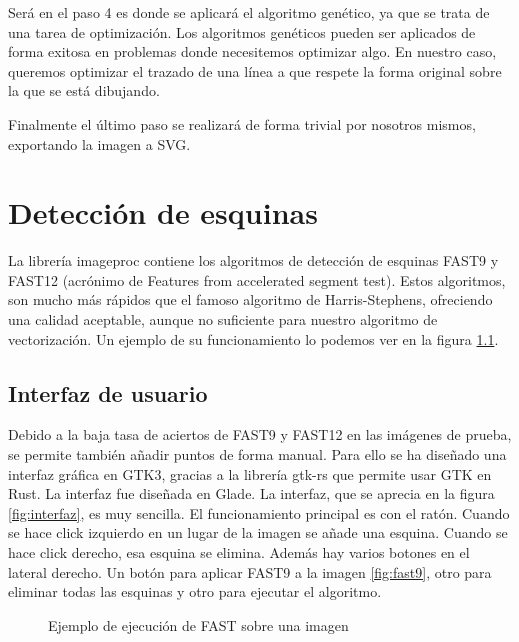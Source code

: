 \documentclass{report}
\begin{document}
Será en el paso 4 es donde se aplicará el algoritmo genético, ya que se trata de una tarea de 
optimización. Los algoritmos genéticos pueden ser aplicados de forma exitosa en problemas donde 
necesitemos optimizar algo. En nuestro caso, queremos optimizar el trazado de una línea a que 
respete la forma original sobre la que se está dibujando.

Finalmente el último paso se realizará de forma trivial por nosotros mismos, 
exportando la imagen a SVG.

\chapter{Detección de esquinas}
La librería imageproc contiene los algoritmos de detección de esquinas
FAST9 y FAST12 \cite{rosten_2006_machine} (acrónimo de Features from accelerated segment test). 
Estos algoritmos, son mucho más rápidos que el
 famoso algoritmo de Harris-Stephens, ofreciendo una calidad aceptable, aunque no suficiente para 
 nuestro algoritmo de vectorización. Un ejemplo de su funcionamiento lo podemos ver en la 
 figura \ref{fig:fast-png}.


\section{Interfaz de usuario}

Debido a la baja tasa de aciertos de FAST9 y FAST12 en las imágenes de prueba, se permite también
añadir puntos de forma manual. Para ello se ha diseñado una interfaz gráfica en GTK3, gracias a
la librería gtk-rs que permite usar GTK en Rust. La interfaz fue diseñada en Glade. La interfaz, 
que se aprecia en la figura \ref{fig:interfaz}, 
es muy sencilla. El funcionamiento principal es con el ratón. Cuando se hace click izquierdo en un
lugar de la imagen se añade una esquina. Cuando se hace click derecho, esa esquina se elimina. 
Además hay varios botones en el lateral derecho. Un botón para aplicar FAST9 a la imagen \ref{fig:fast9}, otro para eliminar 
todas las esquinas y otro para ejecutar el algoritmo.

\begin{figure}
	\caption{\label{fig:fast-png} Ejemplo de ejecución de FAST sobre una imagen}
\end{figure}
\end{document}
